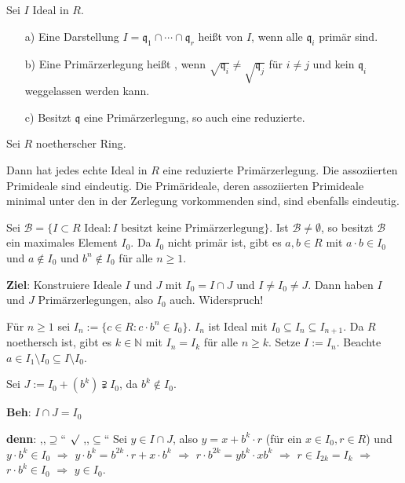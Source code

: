 \begin{Def}
Sei $I$ Ideal in $R$.

\begin{enumerate}
\item[a)] Eine Darstellung $I = \mathfrak{q}_1 \cap \cdots \cap \mathfrak{q}_r$ heißt  von $I$, wenn alle $\mathfrak{q}_i$ primär sind.

\item[b)] Eine Primärzerlegung heißt , wenn $\sqrt{\mathfrak{q}_i} \neq \sqrt{\mathfrak{q}_j}$ für $i \neq j$ und kein $\mathfrak{q}_i$ weggelassen werden kann.

\item[c)] Besitzt $\mathfrak{q}$ eine Primärzerlegung, so auch eine reduzierte.
\end{enumerate}
\end{Def}

\begin{Satz}
Sei $R$ noetherscher Ring.

Dann hat jedes echte Ideal in $R$ eine reduzierte Primärzerlegung. Die assoziierten Primideale sind eindeutig. Die Primärideale, deren assoziierten Primideale minimal unter den in der Zerlegung vorkommenden sind, sind ebenfalls eindeutig.

\begin{Bew}
Sei $\mathcal{B} = \{ I \subset R \text{ Ideal} : I \text{ besitzt keine Primärzerlegung} \}$. Ist $\mathcal{B} \neq \emptyset$, so besitzt $\mathcal{B}$ ein maximales Element $I_0$. Da $I_0$ nicht primär ist, gibt es $a,b \in R$ mit $a \cdot b \in I_0$ und $a \notin I_0$ und $b^n \notin I_0$ für alle $n \geq 1$.

\textbf{Ziel}: Konstruiere Ideale $I$ und $J$ mit $I_0 = I \cap J$ und $I \neq I_0 \neq J$. Dann haben $I$ und $J$ Primärzerlegungen, also $I_0$ auch. Widerspruch!

Für $n \geq 1$ sei $I_n := \{ c \in R : c \cdot b^n \in I_0 \}$. $I_n$ ist Ideal mit $I_0 \subseteq I_n \subseteq I_{n+1}$. Da $R$ noethersch ist, gibt es $k \in \mathbb{N}$ mit $I_n = I_k$ für alle $n \geq k$. Setze $I := I_n$. Beachte $a \in I_1 \setminus I_0 \subseteq I \setminus I_0$.

Sei $J := I_0 + (b^k) \supsetneqq I_0$, da $b^k \notin I_0$.

\textbf{Beh}: $I \cap J = I_0$

\textbf{denn}: ,,$\supseteq$`` $\surd$ ,,$\subseteq$`` Sei $y \in I \cap J$, also $y = x + b^k \cdot r$ (für ein $x \in I_0, r \in R$) und $y \cdot b^k \in I_0$ $\Rightarrow$ $y \cdot b^k = b^{2k} \cdot r + x \cdot b^k$ $\Rightarrow$ $r \cdot b^{2k} = y b^k \cdot x b^k$ $\Rightarrow$ $r \in I_{2k} = I_k$ $\Rightarrow$ $r \cdot b^k \in I_0$ $\Rightarrow$ $y \in I_0$.

\end{Bew}
\end{Satz}
